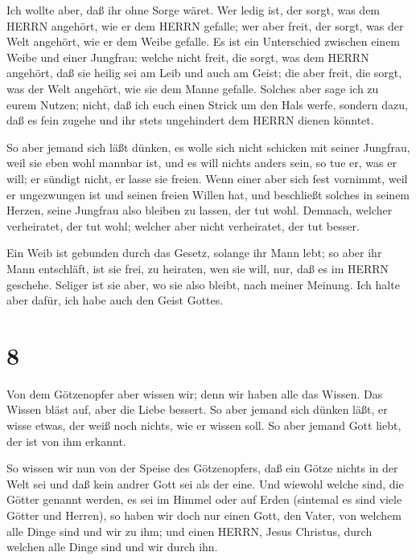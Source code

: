  Ich wollte aber, daß ihr ohne Sorge wäret. Wer ledig ist,
der sorgt, was dem HERRN angehört, wie er dem HERRN gefalle;
 wer aber freit, der sorgt, was der Welt angehört, wie er
dem Weibe gefalle. Es ist ein Unterschied zwischen einem Weibe und einer
Jungfrau:  welche nicht freit, die sorgt, was dem HERRN
angehört, daß sie heilig sei am Leib und auch am Geist; die aber freit,
die sorgt, was der Welt angehört, wie sie dem Manne gefalle.
 Solches aber sage ich zu eurem Nutzen; nicht, daß ich euch
einen Strick um den Hals werfe, sondern dazu, daß es fein zugehe und ihr
stets ungehindert dem HERRN dienen könntet.

 So aber jemand sich läßt dünken, es wolle sich nicht
schicken mit seiner Jungfrau, weil sie eben wohl mannbar ist, und es
will nichts anders sein, so tue er, was er will; er sündigt nicht, er
lasse sie freien.  Wenn einer aber sich fest vornimmt, weil
er ungezwungen ist und seinen freien Willen hat, und beschließt solches
in seinem Herzen, seine Jungfrau also bleiben zu lassen, der tut wohl.
 Demnach, welcher verheiratet, der tut wohl; welcher aber
nicht verheiratet, der tut besser.

 Ein Weib ist gebunden durch das Gesetz, solange ihr Mann
lebt; so aber ihr Mann entschläft, ist sie frei, zu heiraten, wen sie
will, nur, daß es im HERRN geschehe.  Seliger ist sie aber,
wo sie also bleibt, nach meiner Meinung. Ich halte aber dafür, ich habe
auch den Geist Gottes.

\hypertarget{section-7}{%
\section{8}\label{section-7}}

 Von dem Götzenopfer aber wissen wir; denn wir haben alle
das Wissen. Das Wissen bläst auf, aber die Liebe bessert. 
So aber jemand sich dünken läßt, er wisse etwas, der weiß noch nichts,
wie er wissen soll.  So aber jemand Gott liebt, der ist von
ihm erkannt.

 So wissen wir nun von der Speise des Götzenopfers, daß ein
Götze nichts in der Welt sei und daß kein andrer Gott sei als der eine.
 Und wiewohl welche sind, die Götter genannt werden, es sei
im Himmel oder auf Erden (sintemal es sind viele Götter und Herren),
 so haben wir doch nur einen Gott, den Vater, von welchem
alle Dinge sind und wir zu ihm; und einen HERRN, Jesus Christus, durch
welchen alle Dinge sind und wir durch ihn.

